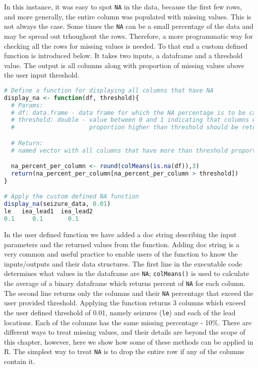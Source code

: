 In this instance, it was easy to spot \verb|NA| in the data, because the first few rows, and more generally, the entire column was populated with missing values. This is not always the case. Some times the \verb|NA| can be a small percentage of the data and may be spread out trhoughout the rows. Therefore, a more programmatic way for checking all the rows for missing values is needed. To that end a custom defined function is introduced below. It takes two inputs, a dataframe and a threshold value. The output is all columns along with proportion of missing values above the user input threshold.
\begin{lstlisting}[language=R]
# Define a function for displaying all columns that have NA
display_na <- function(df, threshold){
  # Params:
  # df: data.frame - data frame for which the NA percentage is to be calculated
  # threshold: double - value between 0 and 1 indicating that columns with NA
  #                     proportion higher than threshold should be returned

  # Return:
  # named vector with all columns that have more than threshold proportion of values with NA

  na_percent_per_column <- round(colMeans(is.na(df)),3)
  return(na_percent_per_column[na_percent_per_column > threshold])
}

# Apply the custom defined NA function
display_na(seizure_data, 0.01)
le   iea_lead1  iea_lead2
0.1     0.1       0.1
\end{lstlisting}
In the user defined function we have added a doc string describing the input parameters and the returned values from the function. Adding doc string is a very common and useful practice to enable users of the function to know the inputs/outputs and their data structures. The first line in the executable code determines what values in the dataframe are \verb|NA|; \verb|colMeans()| is used to calculate the average of a binary dataframe which returns percent of \verb|NA| for each column. The second line returns only the columns and their \verb|NA| percentage that exceed the user provided threshold. Applying the function returns 3 columns which exceed the user defined threshold of 0.01, namely seizures (\verb|le|) and each of the lead locations. Each of the columns has the same missing percentage - 10\%.
There are different ways to treat missing values, and their details are beyond the scope of this chapter, however, here we show how some of these methods can be applied in R.
The simplest way to treat \verb|NA| is to drop the entire row if any of the columns contain it.
